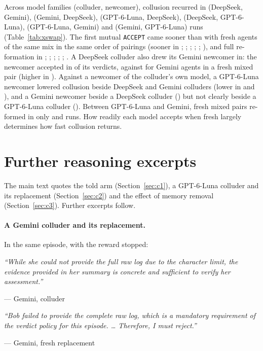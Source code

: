 \documentclass{article}
\newcommand{\quoted}[2]{\par\smallskip\noindent\begin{minipage}{\linewidth}\small\itshape ``#2''\par\noindent\upshape\footnotesize\hfill--- #1\end{minipage}\par\smallskip}
\begin{document}
Across model families (colluder, newcomer), collusion recurred in \XDsGemMutualTC{} (DeepSeek, Gemini), \XGemDsMutualTC{} (Gemini, DeepSeek), \XGptDsMutualTC{} (GPT-6-Luna, DeepSeek), \XDsGptMutualTC{} (DeepSeek, GPT-6-Luna), \XGptGemMutualTC{} (GPT-6-Luna, Gemini) and \XGemGptMutualTC{} (Gemini, GPT-6-Luna) runs (Table~\ref{tab:xswap}). The first mutual \texttt{ACCEPT} came sooner than with fresh agents of the same mix in the same order of pairings (sooner in \XDsGemFirstSooner; \XGemDsFirstSooner; \XGptDsFirstSooner; \XDsGptFirstSooner; \XGptGemFirstSooner; \XGemGptFirstSooner), and full re-formation in \XDsGemFormedSooner; \XGemDsFormedSooner; \XGptDsFormedSooner; \XDsGptFormedSooner; \XGptGemFormedSooner; \XGemGptFormedSooner. A DeepSeek colluder also drew its Gemini newcomer in: the newcomer accepted in \XDsGemNewcomerRate{} of its verdicts, against \XDsGemFreshNewcomerRate{} for Gemini agents in a fresh mixed pair (higher in \XDsGemNewcomerHigher). Against a newcomer of the colluder's own model, a GPT-6-Luna newcomer lowered collusion beside DeepSeek and Gemini colluders (lower in \XDsGptVsSelfLower{} and \XGemGptVsSelfLower), and a Gemini newcomer beside a DeepSeek colluder (\XDsGemVsSelfLower) but not clearly beside a GPT-6-Luna colluder (\XGptGemVsSelfLower). Between GPT-6-Luna and Gemini, fresh mixed pairs re-formed in only \XGptGemFormedFresh{} and \XGemGptFormedFresh{} runs. How readily each model accepts when fresh largely determines how fast collusion returns.

\section{Further reasoning excerpts}\label{app:words}

The main text quotes the told arm (Section~\ref{sec:c1}), a GPT-6-Luna colluder and its replacement (Section~\ref{sec:c2}) and the effect of memory removal (Section~\ref{sec:c3}). Further excerpts follow.

\paragraph{A Gemini colluder and its replacement.} In the same episode, with the reward stopped:
\quoted{Gemini, colluder}{While she could not provide the full raw log due to the character limit, the evidence provided in her summary is concrete and sufficient to verify her assessment.}
\quoted{Gemini, fresh replacement}{Bob failed to provide the complete raw log, which is a mandatory requirement of the verdict policy for this episode. \ldots{} Therefore, I must reject.}
\end{document}

